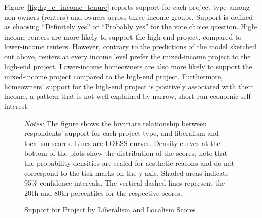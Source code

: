 \documentclass[article,12pt]{memoir}
\begin{document}
Figure~\ref{fig:hg_e_income_tenure} reports support for each project type among non-owners (renters) and owners across three income groups.  Support is defined as choosing ``Definitely yes'' or ``Probably yes'' for the vote choice question.  High-income renters are more likely to support the high-end project, compared to lower-income renters.  However, contrary to the predictions of the model sketched out above, renters at every income level prefer the mixed-income project to the high-end project.  Lower-income homeowners are also more likely to support the mixed-income project compared to the high-end project. Furthermore, homeowners' support for the high-end project is positively associated with their income, a pattern that is not well-explained by narrow, short-run economic self-interest.

\begin{figure}[tb]\centering
  \caption{Support for Project by Liberalism and Localism Scores}
  \label{fig:hg_e_lib_loc}
  \begin{measuredfigure}
  \end{measuredfigure}
  \begin{tablenotes}[flushleft]
    \item \hspace{-.2em}\emph{Notes:} The figure shows the bivariate relationship between respondents' support for each project type, and liberalism and localism scores. Lines are LOESS curves.  Density curves at the bottom of the plots show the distribution of the scores; note that the probability densities are scaled for aesthetic reasons and do not correspond to the tick marks on the y-axis. Shaded areas indicate 95\% confidence intervals. The vertical dashed lines represent the 20th and 80th percentiles for the respective scores.
  \end{tablenotes}
\end{figure}
\end{document}

